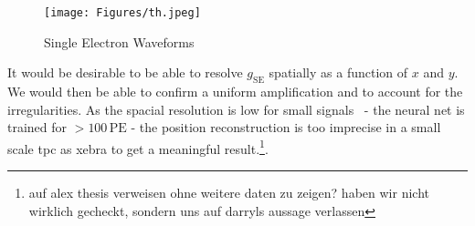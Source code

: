 \begin{figure}
    \centering
    \texttt{[image: Figures/th.jpeg]}  %
    \caption[Single Electrons Waveforms]{
        Single Electron Waveforms
    }
    \label{fig:waveforms-se}
\end{figure}




It would be desirable to be able to resolve $ g_\mathrm{SE} $ spatially as a function of $ x $ and $ y $.
We would then be able to confirm a uniform amplification and to account for the irregularities.
As the spacial resolution is low for small signals~\cite{ABism} - the neural net is trained for $ > 100\,\mathrm{PE} $ - the position reconstruction is too imprecise in a small scale \gls{tpc} as \gls{xebra} to get a meaningful result.\footnote{auf alex thesis verweisen ohne weitere daten zu zeigen? haben wir nicht wirklich gecheckt, sondern uns auf darryls aussage verlassen}.



